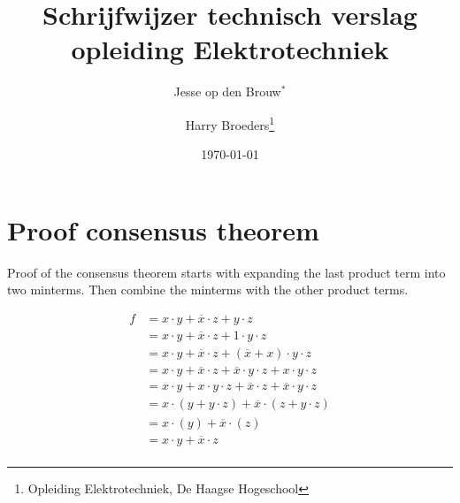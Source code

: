 \documentclass[a4paper,11pt,oneside,fleqn]{article}
\title{Schrijfwijzer technisch verslag opleiding Elektrotechniek}
\author{Jesse op den Brouw$^*$ \and Harry Broeders\thanks{Opleiding Elektrotechniek, De Haagse Hogeschool}}
\date{\today}
\begin{document}
\section*{Proof consensus theorem}

Proof of the consensus theorem starts with expanding the last product term into
two minterms. Then combine the minterms with the other product terms.

\begin{equation}
\begin{split}
f &= x\cdot y + \overline{x}\cdot z + y\cdot z \\
  &= x\cdot y + \overline{x}\cdot z + 1\cdot y\cdot z \\
  &= x\cdot y + \overline{x}\cdot z + (\overline{x}+x)\cdot y\cdot z \\
  &= x\cdot y + \overline{x}\cdot z + \overline{x}\cdot y\cdot z + x\cdot y\cdot z \\
  &= x\cdot y + x\cdot y\cdot z + \overline{x}\cdot z + \overline{x}\cdot y\cdot z \\
  &= x\cdot (y + y\cdot z) + \overline{x}\cdot (z + y\cdot z) \\
  &= x\cdot (y) + \overline{x}\cdot (z) \\
  &= x\cdot y + \overline{x}\cdot z \\
\end{split}
\end{equation}
\end{document}
